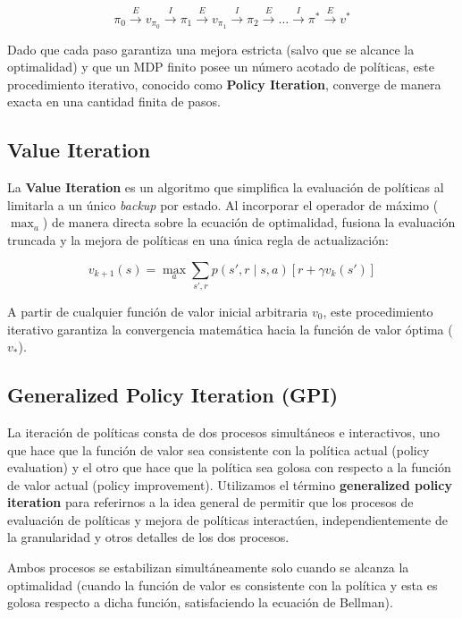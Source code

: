 \documentclass[11pt,a4paper]{article}
\begin{document}
\begin{equation*}
    \pi_0 \stackrel{E}{\longrightarrow} v_{\pi_0} \stackrel{I}{\longrightarrow} \pi_1 \stackrel{E}{\longrightarrow} v_{\pi_1} \stackrel{I}{\longrightarrow} \pi_2 \stackrel{E}{\longrightarrow} \dots \stackrel{I}{\longrightarrow} \pi^* \stackrel{E}{\longrightarrow} v^*
\end{equation*}

Dado que cada paso garantiza una mejora estricta (salvo que se alcance la optimalidad) y que un MDP finito posee un número acotado de políticas, este procedimiento iterativo, conocido como \textbf{Policy Iteration}, converge de manera exacta en una cantidad finita de pasos.

\subsection*{Value Iteration}
La \textbf{Value Iteration}  es un algoritmo que simplifica la evaluación de políticas al limitarla a un único \textit{backup} por estado. Al incorporar el operador de máximo ($\max_a$) de manera directa sobre la ecuación de optimalidad, fusiona la evaluación truncada y la mejora de políticas en una única regla de actualización:

\begin{equation*}
    v_{k+1}(s) = \max_a \sum_{s', r} p(s', r \mid s, a) \left[ r + \gamma v_k(s') \right] 
\end{equation*}

A partir de cualquier función de valor inicial arbitraria $v_0$, este procedimiento iterativo garantiza la convergencia matemática hacia la función de valor óptima ($v_*$).

\subsection*{Generalized Policy Iteration (GPI)}
La iteración de políticas consta de dos procesos simultáneos e interactivos, uno que hace que la función de valor sea consistente con la política actual (policy evaluation) y el otro que hace que la política sea golosa con respecto a la función de valor actual (policy improvement).
Utilizamos el término \textbf{generalized policy iteration} para referirnos a la idea general de permitir que los procesos de evaluación de políticas y mejora de políticas interactúen, independientemente de la granularidad y otros detalles de los dos procesos.

Ambos procesos se estabilizan simultáneamente solo cuando se alcanza la optimalidad (cuando la función de valor es consistente con la política y esta es golosa respecto a dicha función, satisfaciendo la ecuación de Bellman).
\end{document}
